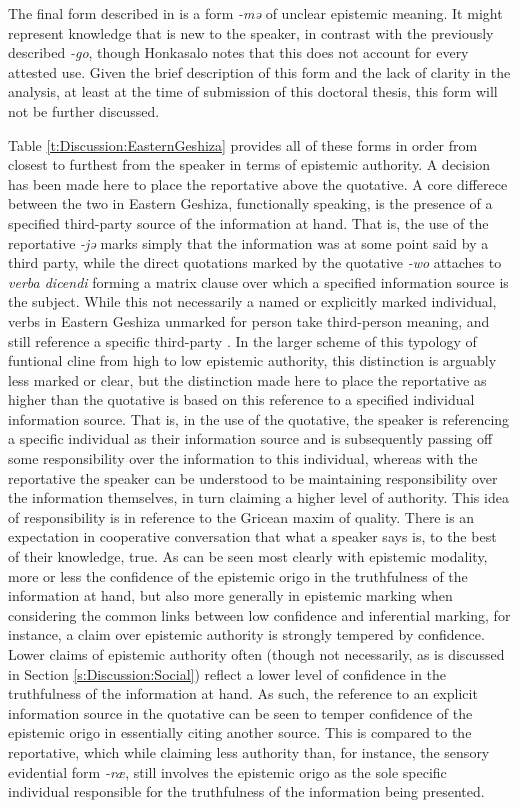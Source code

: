 The final form described in  is a form \textit{-mə} of unclear epistemic meaning. It might represent knowledge that is new to the speaker, in contrast with the previously described \textit{-go}, though Honkasalo notes that this does not account for every attested use. Given the brief description of this form and the lack of clarity in the analysis, at least at the time of submission of this doctoral thesis, this form will not be further discussed.

Table \ref{t:Discussion:EasternGeshiza} provides all of these forms in order from closest to furthest from the speaker in terms of epistemic authority. A decision has been made here to place the reportative above the quotative. A core differece between the two in Eastern Geshiza, functionally speaking, is the presence of a specified third-party source of the information at hand. That is, the use of the reportative \textit{-jə} marks simply that the information was at some point said by a third party, while the direct quotations marked by the quotative \textit{-wo} attaches to \textit{verba dicendi} forming a matrix clause over which a specified information source is the subject. While this not necessarily a named or explicitly marked individual, verbs in Eastern Geshiza unmarked for person take third-person meaning, and still reference a specific third-party \cite[592]{Honkasalo2019}. In the larger scheme of this typology of funtional cline from high to low epistemic authority, this distinction is arguably less marked or clear, but the distinction made here to place the reportative as higher than the quotative is based on this reference to a specified individual information source. That is, in the use of the quotative, the speaker is referencing a specific individual as their information source and is subsequently passing off some responsibility over the information to this individual, whereas with the reportative the speaker can be understood to be maintaining responsibility over the information themselves, in turn claiming a higher level of authority. This idea of responsibility is in reference to the Gricean maxim of quality. There is an expectation in cooperative conversation that what a speaker says is, to the best of their knowledge, true. As can be seen most clearly with epistemic modality, more or less the confidence of the epistemic origo in the truthfulness of the information at hand, but also more generally in epistemic marking when considering the common links between low confidence and inferential marking, for instance, a claim over epistemic authority is strongly tempered by confidence. Lower claims of epistemic authority often (though not necessarily, as is discussed in Section \ref{s:Discussion:Social}) reflect a lower level of confidence in the truthfulness of the information at hand. As such, the reference to an explicit information source in the quotative can be seen to temper confidence of the epistemic origo in essentially citing another source. This is compared to the reportative, which while claiming less authority than, for instance, the sensory evidential form \textit{-ræ}, still involves the epistemic origo as the sole specific individual responsible for the truthfulness of the information being presented.

